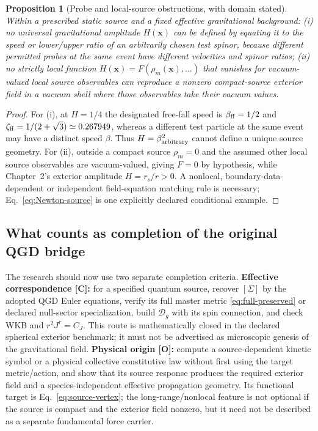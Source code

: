 \documentclass[11pt,a4paper]{article}
\newtheorem{proposition}{Proposition}[section]\newtheorem{lemma}[proposition]{Lemma}\newtheorem{definition}[proposition]{Definition}\newtheorem{remark}[proposition]{Remark}
\begin{document}
\begin{proposition}[Probe and local-source obstructions, with domain stated]\label{prop:local-obstruction}
Within a prescribed static source and a fixed effective gravitational background: (i) no universal gravitational amplitude $H(\bm x)$ can be defined by equating it to the speed or lower/upper ratio of \emph{an arbitrarily chosen} test spinor, because different permitted probes at the same event have different velocities and spinor ratios; (ii) no strictly local function $H(\bm x)=F(\rho_m(\bm x),\ldots)$ that vanishes for vacuum-valued local source observables can reproduce a nonzero compact-source exterior field in a vacuum shell where those observables take their vacuum values.
\end{proposition}
\begin{proof}
For (i), at $H=1/4$ the designated free-fall speed is $\beta_{\rm ff}=1/2$ and $\zeta_{\rm ff}=1/(2+\sqrt3)\simeq0.267949$, whereas a different test particle at the same event may have a distinct speed $\beta$. Thus $H=\beta_{\rm arbitrary}^2$ cannot define a unique source geometry. For (ii), outside a compact source $\rho_m=0$ and the assumed other local source observables are vacuum-valued, giving $F=0$ by hypothesis, while Chapter~2's exterior amplitude $H=r_s/r>0$. A nonlocal, boundary-data-dependent or independent field-equation matching rule is necessary; Eq.~\eqref{eq:Newton-source} is one explicitly declared conditional example.
\end{proof}

\subsection{What counts as completion of the original QGD bridge}
The research should now use two separate completion criteria. \textbf{Effective correspondence [C]:} for a specified quantum source, recover $[\Sigma]$ by the adopted QGD Euler equations, verify its full master metric \eqref{eq:full-preserved} or declared null-sector specialization, build $\mathcal D_g$ with its spin connection, and check WKB and $r^2J^r=C_J$. This route is mathematically closed in the declared spherical exterior benchmark; it must not be advertised as microscopic genesis of the gravitational field. \textbf{Physical origin [O]:} compute a source-dependent kinetic symbol or a physical collective constitutive law without first using the target metric/action, and show that its source response produces the required exterior field and a species-independent effective propagation geometry. Its functional target is Eq.~\eqref{eq:source-vertex}; the long-range/nonlocal feature is not optional if the source is compact and the exterior field nonzero, but it need not be described as a separate fundamental force carrier.
\end{document}
